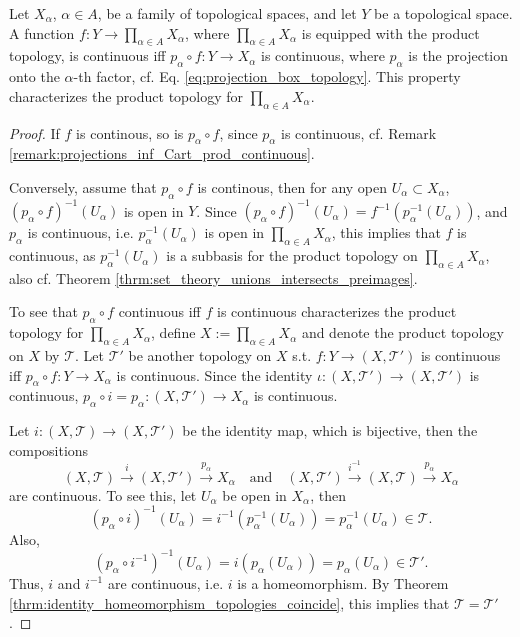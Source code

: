 \begin{theorem}
	Let $X_\alpha$, $\alpha\in A$, be a family of topological spaces, and let $Y$ be a topological space. A function $f: Y\to \prod_{\alpha\in A}X_{\alpha}$, where $\prod_{\alpha\in A}X_{\alpha}$ is equipped with the product topology, is continuous iff $p_{\alpha}\circ f: Y\to X_{\alpha}$ is continuous, where $p_{\alpha}$ is the projection onto the $\alpha$-th factor, cf. Eq. \eqref{eq:projection_box_topology}. This property characterizes the product topology for $\prod_{\alpha\in A}X_{\alpha}$.
\end{theorem}

\begin{proof}
	If $f$ is continous, so is $p_{\alpha}\circ f$, since $p_{\alpha}$ is continuous, cf. Remark \ref{remark:projections_inf_Cart_prod_continuous}. 
	
	Conversely, assume that $p_{\alpha}\circ f$ is continous, then for any open $U_{\alpha}\subset X_{\alpha}$, $(p_{\alpha}\circ f)^{-1}(U_{\alpha})$ is open in $Y$. Since $(p_{\alpha}\circ f)^{-1}(U_{\alpha}) = f^{-1}(p_{\alpha}^{-1}(U_{\alpha}))$, and $p_{\alpha}$ is continuous, i.e. $p_{\alpha}^{-1}(U_{\alpha})$ is open in $\prod_{\alpha\in A}X_{\alpha}$, this implies that $f$ is continuous, as $p_{\alpha}^{-1}(U_{\alpha})$ is a subbasis for the product topology on $\prod_{\alpha\in A}X_{\alpha}$, also cf. Theorem \ref{thrm:set_theory_unions_intersects_preimages}.
	
	To see that $p_{\alpha}\circ f$ continuous iff $f$ is continuous characterizes the product topology for $\prod_{\alpha\in A}X_{\alpha}$, define $X := \prod_{\alpha\in A}X_{\alpha}$ and denote the product topology on $X$ by $\mathscr T$. Let $\mathscr T'$ be another topology on $X$ s.t. $f: Y\to (X, \mathscr T')$ is continuous iff $p_{\alpha}\circ f: Y\to X_{\alpha}$ is continuous. Since the identity $\iota: (X, \mathscr T') \to (X, \mathscr T')$ is continuous, $p_{\alpha}\circ i = p_{\alpha}: (X, \mathscr T')\to X_{\alpha}$ is continuous. 
	
	Let $i: (X, \mathscr T)\to (X, \mathscr T')$ be the identity map, which is bijective, then the compositions
	$$(X, \mathscr T)\overset{i}{\to} (X, \mathscr T') \overset{p_{\alpha}}{\to}X_{\alpha} \quad \text{and}\quad (X, \mathscr T') \overset{i^{-1}}{\to} (X, \mathscr T)\overset{p_{\alpha}}{\to} X_{\alpha}$$
	are continuous. To see this, let $U_{\alpha}$ be open in $X_{\alpha}$, then
	$$(p_{\alpha} \circ i)^{-1}(U_{\alpha}) = i^{-1}\left(p_{\alpha}^{-1}(U_{\alpha})\right) = p_{\alpha}^{-1}(U_{\alpha})\in \mathscr T.$$ 
	Also, $$\left(p_{\alpha}\circ i^{-1}\right)^{-1}(U_{\alpha}) = i(p_{\alpha}(U_{\alpha})) = p_{\alpha}(U_{\alpha})\in \mathscr T'.$$
	Thus, $i$ and $i^{-1}$ are continuous, i.e. $i$ is a homeomorphism. By Theorem \ref{thrm:identity_homeomorphism_topologies_coincide}, this implies that $\mathscr T = \mathscr T'$.
\end{proof}

